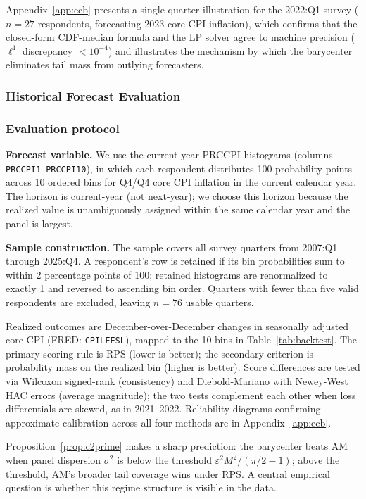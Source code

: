 Appendix~\ref{app:ecb} presents a single-quarter illustration for the 2022:Q1 survey ($n=27$ respondents, forecasting 2023 core CPI inflation), which confirms that the closed-form CDF-median formula and the LP solver agree to machine precision ($\ell^1$ discrepancy $< 10^{-4}$) and illustrates the mechanism by which the barycenter eliminates tail mass from outlying forecasters.

\subsubsection{Historical Forecast Evaluation}
\label{sec:spf_backtest}

\subsubsection*{Evaluation protocol}

\noindent\textbf{Forecast variable.}  We use the current-year PRCCPI histograms (columns \texttt{PRCCPI1}--\texttt{PRCCPI10}), in which each respondent distributes 100 probability points across 10 ordered bins for Q4/Q4 core CPI inflation in the current calendar year.  The horizon is current-year (not next-year); we choose this horizon because the realized value is unambiguously assigned within the same calendar year and the panel is largest.

\noindent\textbf{Sample construction.}  The sample covers all survey quarters from 2007:Q1 through 2025:Q4.  A respondent's row is retained if its bin probabilities sum to within 2 percentage points of 100; retained histograms are renormalized to exactly 1 and reversed to ascending bin order.  Quarters with fewer than five valid respondents are excluded, leaving $n = 76$ usable quarters.

Realized outcomes are December-over-December changes in seasonally adjusted core CPI (FRED: \texttt{CPILFESL}), mapped to the 10 bins in Table~\ref{tab:backtest}.  The primary scoring rule is RPS \cite{gneiting07} (lower is better); the secondary criterion is probability mass on the realized bin (higher is better).  Score differences are tested via Wilcoxon signed-rank (consistency) and Diebold-Mariano \cite{diebold95} with Newey-West HAC errors (average magnitude); the two tests complement each other when loss differentials are skewed, as in 2021--2022.  Reliability diagrams confirming approximate calibration across all four methods are in Appendix~\ref{app:ecb}.

Proposition~\ref{prop:c2prime} makes a sharp prediction: the barycenter beats AM when panel dispersion $\sigma^2$ is below the threshold $\varepsilon^2 M^2 / (\pi/2 - 1)$; above the threshold, AM's broader tail coverage wins under RPS.
A central empirical question is whether this regime structure is visible in the data.

